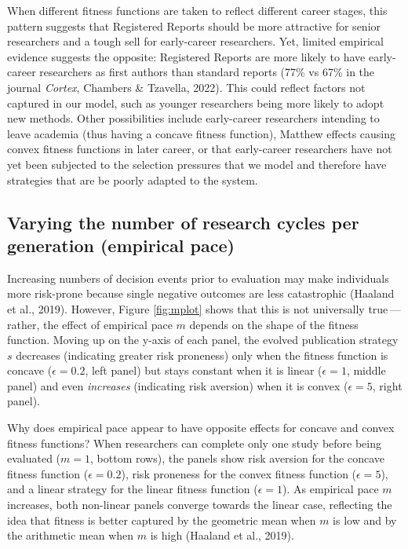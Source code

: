 \documentclass[
  british,
  a4paper,
  ,man,mask,floatsintext]{apa6}
\begin{document}
When different fitness functions are taken to reflect different career stages,
this pattern suggests that Registered Reports should be more attractive for senior researchers and a tough sell for early-career researchers.
Yet, limited empirical evidence suggests the opposite:
Registered Reports are more likely to have early-career researchers as first authors than standard reports (77\% vs 67\% in the journal \emph{Cortex}, Chambers \& Tzavella, 2022).
This could reflect factors not captured in our model, such as younger researchers being more likely to adopt new methods.
Other possibilities include early-career researchers intending to leave academia (thus having a concave fitness function), Matthew effects causing convex fitness functions in later career, or that early-career researchers have not yet been subjected to the selection pressures that we model and therefore have strategies that are be poorly adapted to the system.

\subsection{Varying the number of research cycles per generation (empirical pace)}\label{varying-the-number-of-research-cycles-per-generation-empirical-pace}

Increasing numbers of decision events prior to evaluation may make individuals more risk-prone because single negative outcomes are less catastrophic (Haaland et al., 2019).
However, Figure \ref{fig:mplot} shows that this is not universally true\(\,\)---\(\,\)rather, the effect of empirical pace \(m\) depends on the shape of the fitness function.
Moving up on the y-axis of each panel, the evolved publication strategy \(s\) decreases (indicating greater risk proneness) only when the fitness function is concave (\(\epsilon = 0.2\), left panel) but stays constant when it is linear (\(\epsilon = 1\), middle panel) and even \emph{increases} (indicating risk aversion) when it is convex (\(\epsilon = 5\), right panel).

Why does empirical pace appear to have opposite effects for concave and convex fitness functions?
When researchers can complete only one study before being evaluated (\(m = 1\), bottom rows), the panels show risk aversion for the concave fitness function (\(\epsilon = 0.2\)), risk proneness for the convex fitness function (\(\epsilon = 5\)), and a linear strategy for the linear fitness function (\(\epsilon = 1\)).
As empirical pace \(m\) increases, both non-linear panels converge towards the linear case, reflecting the idea that fitness is better captured by the geometric mean when \(m\) is low and by the arithmetic mean when \(m\) is high (Haaland et al., 2019).
\end{document}
